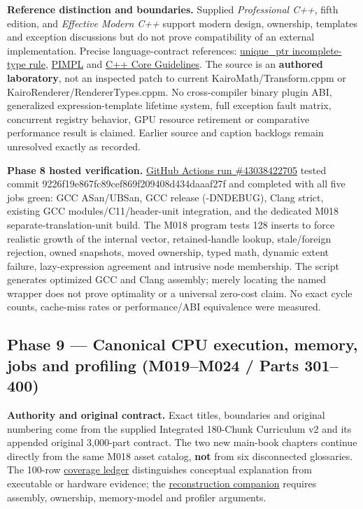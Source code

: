 \textbf{Reference distinction and boundaries.} Supplied \emph{Professional C++}, fifth edition, and \emph{Effective Modern C++} support modern design, ownership, templates and exception discussions but do not prove compatibility of an external implementation. Precise language-contract references: \href{https://en.cppreference.com/w/cpp/memory/unique_ptr}{unique\_ptr incomplete-type rule}, \href{https://en.cppreference.com/w/cpp/language/pimpl}{PIMPL} and \href{https://isocpp.github.io/CppCoreGuidelines/CppCoreGuidelines}{C++ Core Guidelines}. The source is an \textbf{authored laboratory}, not an inspected patch to current KairoMath/Transform.cppm or KairoRenderer/RendererTypes.cppm. No cross-compiler binary plugin ABI, generalized expression-template lifetime system, full exception fault matrix, concurrent registry behavior, GPU resource retirement or comparative performance result is claimed. Earlier source and caption backlogs remain unresolved exactly as recorded.

\textbf{Phase 8 hosted verification.} \href{https://github.com/swayam8624/Project_008_AllMight/actions/runs/43038422705}{GitHub Actions run \#43038422705} tested commit 9226f19e867fc89cef869f209408d434daaaf27f and completed with all five jobs green: GCC ASan/UBSan, GCC release (-DNDEBUG), Clang strict, existing GCC modules/C11/header-unit integration, and the dedicated M018 separate-translation-unit build. The M018 program tests 128 inserts to force realistic growth of the internal vector, retained-handle lookup, stale/foreign rejection, owned snapshots, moved ownership, typed math, dynamic extent failure, lazy-expression agreement and intrusive node membership. The script generates optimized GCC and Clang assembly; merely locating the named wrapper does not prove optimality or a universal zero-cost claim. No exact cycle counts, cache-miss rates or performance/ABI equivalence were measured.

\subsection{Phase 9 --- Canonical CPU execution, memory, jobs and profiling (M019--M024 / Parts 301--400)}\label{appendix-a103e7846d21-phase-9-canonical-cpu-execution-memory-jobs-and-profiling-m019m024-parts-301400}

\textbf{Authority and original contract.} Exact titles, boundaries and original numbering come from the supplied Integrated 180-Chunk Curriculum v2 and its appended original 3,000-part contract. The two new main-book chapters continue directly from the same M018 asset catalog, \textbf{not} from six disconnected glossaries. The 100-row \hyperref[appendix-fd090d982a15-phase-4-cpu-architecture-and-measured-execution-parts-301400]{coverage ledger} distinguishes conceptual explanation from executable or hardware evidence; the \hyperref[appendix-2587680a4fe3]{reconstruction companion} requires assembly, ownership, memory-model and profiler arguments.

